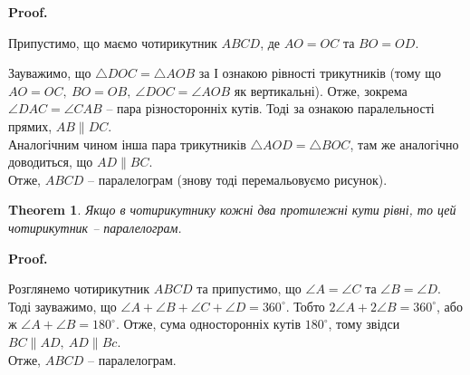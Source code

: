 \documentclass[a4paper, 10pt]{article}
\makeatletter
\def\qed{$\blacksquare$}
\theoremstyle{theoremdd}
\newtheorem{theorem}{Theorem}[subsection]
\theoremstyle{theoremdd}
\theoremstyle{theoremdd}
\theoremstyle{theoremdd}
\theoremstyle{theoremdd}
\theoremstyle{theoremdd}
\theoremstyle{theoremdd}
\theoremstyle{theoremdd}
\theoremstyle{theoremdd}
\renewenvironment{proof}[1][Proof.\\]{\par
\pushQED{\hfill \qed}%
\normalfont \topsep6\p@\@plus6\p@\relax
\trivlist
\item\relax
{\bfseries
#1\@addpunct{.}}\hspace\labelsep\ignorespaces
}{%
\popQED\endtrivlist\@endpefalse
}
\makeatother
\begin{document}
\begin{proof}
Припустимо, що маємо чотирикутник $ABCD$, де $AO = OC$ та $BO = OD$.
\begin{figure}[H]
\centering
{}
\end{figure}
Зауважимо, що $\triangle DOC = \triangle AOB$ за І ознакою рівності трикутників (тому що $AO = OC,\ BO = OB,\ \angle DOC = \angle AOB$ як вертикальні). Отже, зокрема $\angle DAC = \angle CAB$ -- пара різносторонніх кутів. Тоді за ознакою паралельності прямих, $AB \parallel DC$.\\
Аналогічним чином інша пара трикутників $\triangle AOD = \triangle BOC$, там же аналогічно доводиться, що $AD \parallel BC$.\\
Отже, $ABCD$ -- паралелограм (знову тоді перемальовуємо рисунок).
\end{proof}

\begin{theorem}
Якщо в чотирикутнику кожні два протилежні кути рівні, то цей чотирикутник -- паралелограм.
\end{theorem}

\begin{proof}
Розглянемо чотирикутник $ABCD$ та припустимо, що $\angle A = \angle C$ та $\angle B = \angle D$. Тоді зауважимо, що $\angle A + \angle B + \angle C + \angle D = 360^\circ$. Тобто $2 \angle A + 2 \angle B = 360^\circ$, або ж $\angle A + \angle B = 180^\circ$. Отже, сума односторонніх кутів $180^\circ$, тому звідси $BC \parallel AD,\ AD \parallel Bc$.\\
Отже, $ABCD$ -- паралелограм.
\end{proof}
\end{document}
